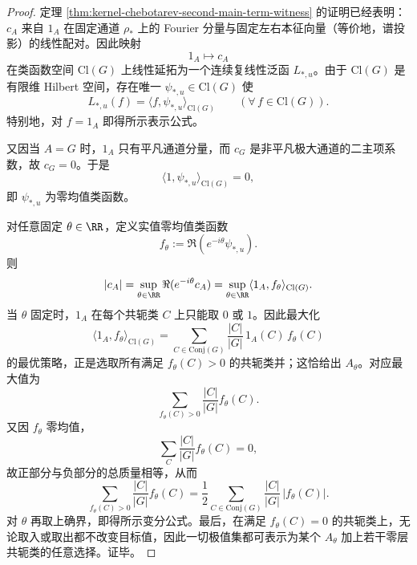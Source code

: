 \begin{proof}
定理 \ref{thm:kernel-chebotarev-second-main-term-witness} 的证明已经表明：\(c_A\) 来自 \(1_A\) 在固定通道 \(\rho_\ast\) 上的 Fourier 分量与固定左右本征向量（等价地，谱投影）的线性配对。因此映射
\[
1_A\longmapsto c_A
\]
在类函数空间 \(\mathrm{Cl}(G)\) 上线性延拓为一个连续复线性泛函 \(L_{\ast,u}\)。由于 \(\mathrm{Cl}(G)\) 是有限维 Hilbert 空间，存在唯一 \(\psi_{\ast,u}\in \mathrm{Cl}(G)\) 使
\[
L_{\ast,u}(f)=\langle f,\psi_{\ast,u}\rangle_{\mathrm{Cl}(G)}
\qquad(\forall\,f\in \mathrm{Cl}(G)).
\]
特别地，对 \(f=1_A\) 即得所示表示公式。

又因当 \(A=G\) 时，\(1_A\) 只有平凡通道分量，而 \(c_G\) 是非平凡极大通道的二主项系数，故 \(c_G=0\)。于是
\[
\langle 1,\psi_{\ast,u}\rangle_{\mathrm{Cl}(G)}=0,
\]
即 \(\psi_{\ast,u}\) 为零均值类函数。

对任意固定 \(\theta\in\RR\)，定义实值零均值类函数
\[
f_\theta:=\Re(e^{-i\theta}\psi_{\ast,u}).
\]
则
\[
|c_A|
=
\sup_{\theta\in\RR}\Re(e^{-i\theta}c_A)
=
\sup_{\theta\in\RR}\langle 1_A,f_\theta\rangle_{\mathrm{Cl}(G)}.
\]
当 \(\theta\) 固定时，\(1_A\) 在每个共轭类 \(C\) 上只能取 \(0\) 或 \(1\)。因此最大化
\[
\langle 1_A,f_\theta\rangle_{\mathrm{Cl}(G)}
=
\sum_{C\in \mathrm{Conj}(G)}\frac{|C|}{|G|}\,1_A(C)\,f_\theta(C)
\]
的最优策略，正是选取所有满足 \(f_\theta(C)>0\) 的共轭类并；这恰给出 \(A_\theta\)。对应最大值为
\[
\sum_{f_\theta(C)>0}\frac{|C|}{|G|}f_\theta(C).
\]
又因 \(f_\theta\) 零均值，
\[
\sum_{C}\frac{|C|}{|G|}f_\theta(C)=0,
\]
故正部分与负部分的总质量相等，从而
\[
\sum_{f_\theta(C)>0}\frac{|C|}{|G|}f_\theta(C)
=
\frac12
\sum_{C\in \mathrm{Conj}(G)}\frac{|C|}{|G|}\,|f_\theta(C)|.
\]
对 \(\theta\) 再取上确界，即得所示变分公式。最后，在满足 \(f_\theta(C)=0\) 的共轭类上，无论取入或取出都不改变目标值，因此一切极值集都可表示为某个 \(A_\theta\) 加上若干零层共轭类的任意选择。证毕。
\end{proof}

\endinput
